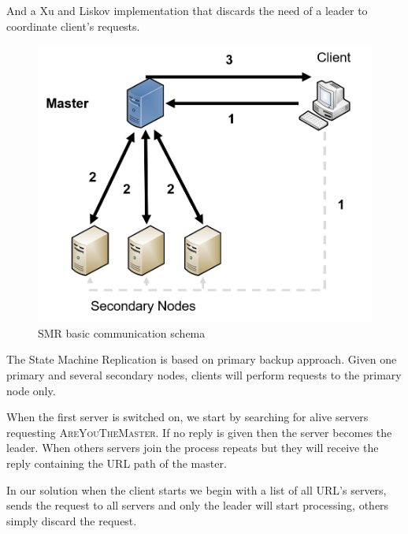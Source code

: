 \documentclass[times, 10pt,twocolumn]{article}
\begin{document}
And a Xu and Liskov implementation that discards the need of a leader to
coordinate client's requests.



\begin{figure}
   \includegraphics[width=\linewidth]{smr_basic.png}
   \caption{SMR basic communication schema}
   \label{fig:smr_basic}
 \end{figure}

The State Machine Replication is based on primary backup approach. Given one
primary and several secondary nodes, clients will perform requests to the
primary node only.

When the first server is switched on, we start by searching for alive servers
requesting \textsc{AreYouTheMaster}. If no reply is given then the server
becomes the leader. When others servers join the process repeats but they
will receive the reply containing the URL path of the master.


In our solution when the client starts we begin with a list of all URL's servers,
sends the request to all servers and only the leader will start processing, others
simply discard the request.

\end{document}
